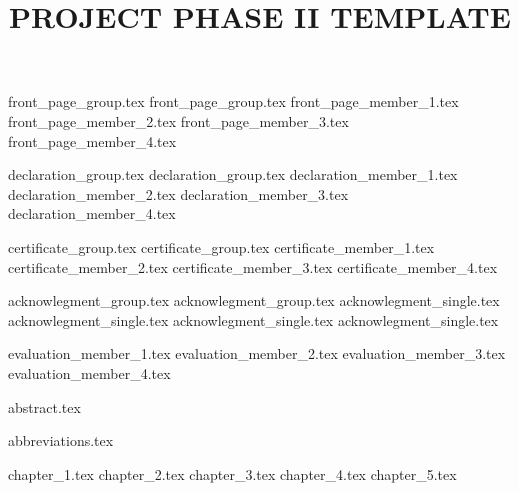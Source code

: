 \documentclass[english,12pt,a4paper,oneside]{book}
\date{}
\title{PROJECT PHASE II TEMPLATE}
\begin{document}
	{front_page_group.tex}
	{front_page_group.tex}
	{front_page_member_1.tex}
	{front_page_member_2.tex}
	{front_page_member_3.tex}
	{front_page_member_4.tex}
	
	{declaration_group.tex}
	{declaration_group.tex}
	{declaration_member_1.tex}
	{declaration_member_2.tex}
	{declaration_member_3.tex}
	{declaration_member_4.tex}
	
	{certificate_group.tex}
	{certificate_group.tex}
	{certificate_member_1.tex}
	{certificate_member_2.tex}
	{certificate_member_3.tex}
	{certificate_member_4.tex}
	
	{acknowlegment_group.tex}
	{acknowlegment_group.tex}
	{acknowlegment_single.tex}
	{acknowlegment_single.tex}
	{acknowlegment_single.tex}
	{acknowlegment_single.tex}
	
	{evaluation_member_1.tex}
	{evaluation_member_2.tex}
	{evaluation_member_3.tex}
	{evaluation_member_4.tex}
	
	{abstract.tex}
	
	\newpage
	\tableofcontents
	
	\newpage
	\listoffigures 
	
	{abbreviations.tex}
	
	{chapter_1.tex}
	{chapter_2.tex}
	{chapter_3.tex}
	{chapter_4.tex}
	{chapter_5.tex}
	
	\renewcommand{\bibname}{References} %
	{\fontsize{12}{14}\selectfont \printbibliography}

	
\end{document}

